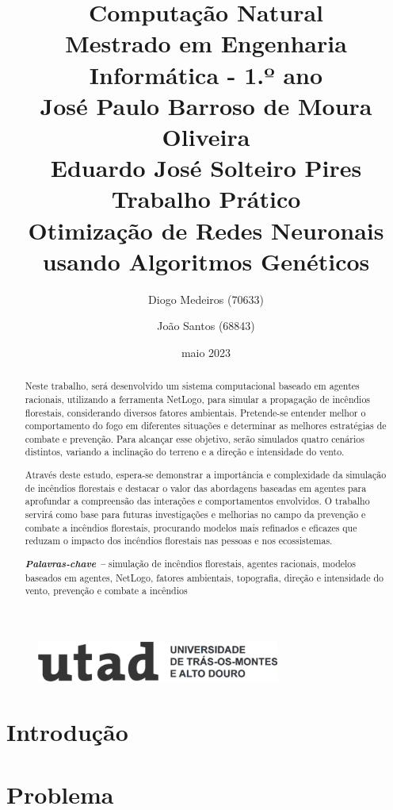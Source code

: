 \documentclass[a4paper, portuguese]{report}
\title{{\textbf{Computação Natural}}\\ Mestrado em Engenharia Informática - 1.º ano\\\vspace*{1cm} José Paulo Barroso de Moura Oliveira\\ Eduardo José Solteiro Pires\\\vspace*{3cm}\textbf{Trabalho Prático}\\\vspace*{0.5cm} Otimização de Redes Neuronais usando Algoritmos Genéticos \vspace*{1cm}}
\author{Diogo Medeiros (70633) \and João Santos (68843)}
\date{maio 2023}
\providecommand{\keywords}[1]
{
    \small
    \textbf{\textit{Palavras-chave --}} #1
}
\begin{document}
    \begin{figure}
        \includegraphics[width=8cm]{images/utad}
        \label{fig:utad_logo}
    \end{figure}
    \maketitle
    \begin{abstract}

        Neste trabalho, será desenvolvido um sistema computacional baseado em agentes racionais, utilizando a ferramenta NetLogo, para simular a propagação de incêndios florestais, considerando diversos fatores ambientais.
        Pretende-se entender melhor o comportamento do fogo em diferentes situações e determinar as melhores estratégias de combate e prevenção.
        Para alcançar esse objetivo, serão simulados quatro cenários distintos, variando a inclinação do terreno e a direção e intensidade do vento.

        Através deste estudo, espera-se demonstrar a importância e complexidade da simulação de incêndios florestais e destacar o valor das abordagens baseadas em agentes para aprofundar a compreensão das interações e comportamentos envolvidos.
        O trabalho servirá como base para futuras investigações e melhorias no campo da prevenção e combate a incêndios florestais, procurando modelos mais refinados e eficazes que reduzam o impacto dos incêndios florestais nas pessoas e nos ecossistemas.

        \keywords{simulação de incêndios florestais, agentes racionais, modelos baseados em agentes, NetLogo, fatores ambientais, topografia, direção e intensidade do vento, prevenção e combate a incêndios}

    \end{abstract}
    \tableofcontents
    \listoffigures
    \listoftables
    \listofalgorithms


    \chapter{Introdução}\label{ch:introduction}
    


    \chapter{Problema}\label{ch:problem}
\end{document}
